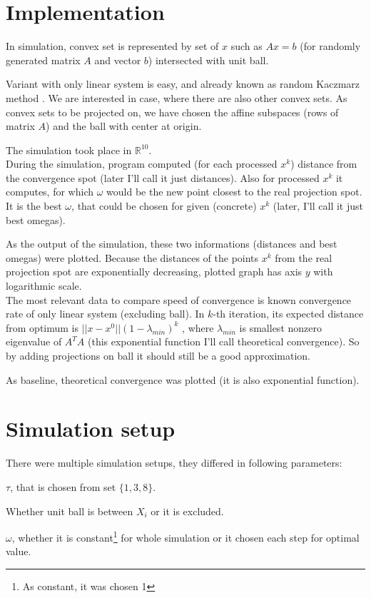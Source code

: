 \documentclass[11pt]{book}
\newcommand{\R}{\mathbb{R}}
\begin{document}
\section{Implementation}

In simulation, convex set is represented by set of $x$ such as $Ax=b$ (for randomly generated matrix $A$ and vector $b$) intersected with unit ball.

Variant with only linear system is easy, and already known as random Kaczmarz method \cite{kaczmarz, iterativeLinearSystems}. We are interested in case, where there are also other convex sets. As convex sets to be projected on, we have chosen the affine subspaces (rows of matrix $A$) and the ball with center at origin.

The simulation took place in $\R^{10}$.\\

During the simulation, program computed (for each processed $x^k$) distance from the convergence spot (later I'll call it just distances). Also for processed $x^k$ it computes, for which $\omega$ would be the new point closest to the real projection spot. It is the best $\omega$, that could be chosen for given (concrete) $x^k$ (later, I'll call it just best omegas).

As the output of the simulation, these two informations (distances and best omegas) were plotted. Because the distances of the points $x^k$ from the real projection spot are exponentially decreasing, plotted graph has axis $y$ with logarithmic scale.\\

The most relevant data to compare speed of convergence is known convergence rate of only linear system (excluding ball). In $k$-th iteration, its expected distance from optimum is $||x-x^0||(1-\lambda_{min})^k$ \cite{kaczmarz}, where $\lambda_{min}$ is smallest nonzero eigenvalue of $A^TA$ (this exponential function I'll call theoretical convergence). So by adding projections on ball it should still be a good approximation.

As baseline, theoretical convergence was plotted (it is also exponential function).

\section{Simulation setup}

There were multiple simulation setups, they differed in following parameters:

\begin{list}{•}{}
	\item $\tau$, that is chosen from set $\{ 1, 3, 8 \}$.
	\item Whether unit ball is between $X_i$ or it is excluded.
	\item $\omega$, whether it is constant\footnote{As constant, it was chosen 1} for whole simulation or it chosen each step for optimal value.
\end{list}
\end{document}
